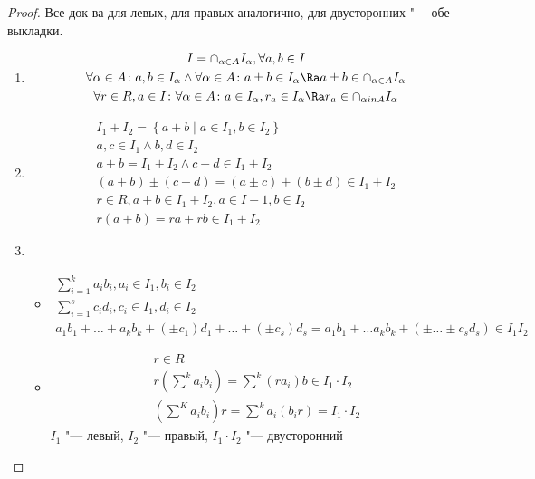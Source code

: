 \begin{proof}
	Все док-ва для левых, для правых аналогично, для двусторонних "--- обе выкладки.
	\begin{enumerate}
	\item 	\begin{gather*}
			 I = \cap_{\alpha \in A} I_\alpha, \forall a, b \in I \\
			 \forall \alpha \in A \colon a, b \in I_\alpha \land \forall \alpha \in A \colon a \pm b \in I_\alpha \Ra a \pm b \in \cap_{\alpha \in A}I_\alpha \\
			 \forall r \in R, a \in I \colon \forall \alpha \in A \colon a \in I_\alpha, r_a \in I_\alpha \Ra r_a \in \cap_{\alpha in A} I_\alpha
		 \end{gather*}
	\item	\begin{gather*}
			 I_1 + I_2 = \left\{ a + b \mid a \in I_1, b \in I_2 \right\} \\
			a, c \in I_1 \land b, d \in I_2 \\
			a + b = I_1 + I_2 \land c + d \in I_1 + I_2 \\
			(a + b) \pm (c + d) = (a \pm c) + (b \pm d) \in I_1 + I_2 \\
			r \in R, a + b \in I_1 + I_2,  a \in I-1, b \in I_2 \\
			r(a + b) = ra + rb \in I_1 + I_2
		\end{gather*}
	\item \begin{itemize}
		\item \begin{gather*}
			\sum_{i = 1}^k a_i b_i, a_i \in I_1, b_i \in I_2 \\
			\sum_{i = 1}^s c_i d_i, c_i \in I_1, d_i \in I_2 \\
			a_1 b_1 + \dots + a_k b_k + (\pm c_1)d_1 + \dots + (\pm c_s)d_s = a_1 b_1 + \dots a_k b_k + (\pm \dots \pm c_s d_s) \in I_1 I_2
		\end{gather*}
		\item \begin{gather*}
			r \in R \\
			r\left(\sum^k a_i b_i\right) = \sum^k (ra_i)b \in I_1 \cdot I_2 \\
			\left(\sum^K a_i b_i\right)r = \sum^k a_i(b_ir) = I_1 \cdot I_2
		\end{gather*}
		$I_1$ "--- левый, $I_2$ "--- правый, $I_1 \cdot I_2$ "--- двусторонний
		\end{itemize}
	\end{enumerate}
\end{proof}

